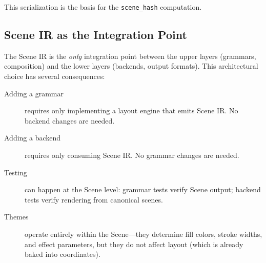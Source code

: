 This serialization is the basis for the \texttt{scene\_hash} computation.

\subsection{Scene IR as the Integration Point}

The Scene IR is the \emph{only} integration point between the upper layers (grammars, composition) and the lower layers (backends, output formats). This architectural choice has several consequences:

\begin{description}
  \item[Adding a grammar] requires only implementing a layout engine that emits Scene IR. No backend changes are needed.
  
  \item[Adding a backend] requires only consuming Scene IR. No grammar changes are needed.
  
  \item[Testing] can happen at the Scene level: grammar tests verify Scene output; backend tests verify rendering from canonical scenes.
  
  \item[Themes] operate entirely within the Scene---they determine fill colors, stroke widths, and effect parameters, but they do not affect layout (which is already baked into coordinates).
\end{description}
